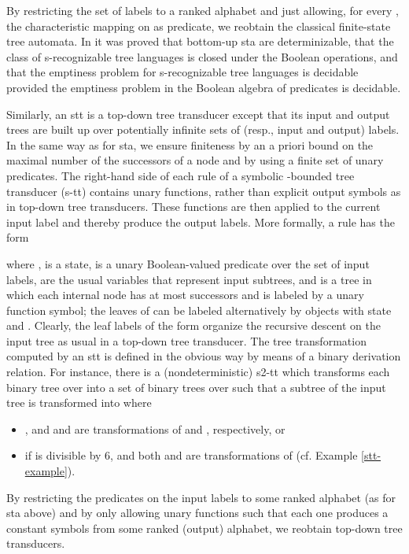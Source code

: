 \documentclass[10pt]{scrartcl}
\begin{document}
By restricting the set of labels to a ranked alphabet  and just allowing, for every , the characteristic mapping on  as predicate, we reobtain the classical finite-state tree automata. In \cite{veabjo11a} it was proved that bottom-up sta are determinizable, that the class of s-recognizable tree languages is closed under the Boolean operations, and that the emptiness problem for s-recognizable tree languages is decidable provided the emptiness problem in the Boolean algebra of predicates is decidable.

Similarly, an stt is a top-down tree transducer \cite{tha70,rou70,eng75} except that its input and output trees  are built up over potentially infinite sets of (resp., input and output) labels. 
In the same way as for  sta, we ensure finiteness by an a priori bound  on the maximal number of the successors of a node and by using a finite set of unary predicates. The right-hand side of each rule of a symbolic -bounded tree transducer (s-tt) 
contains unary functions, rather than explicit output symbols as in top-down tree transducers. These functions are then applied to the current input label and thereby produce the output labels. More formally, a rule has the form

where ,  is a state,  is a unary Boolean-valued predicate over the set of input labels,  are the usual variables that represent input subtrees, and  is a tree in which each internal node has at most  successors and is labeled by a unary function symbol; the leaves of  can be labeled alternatively by objects  with state  and . Clearly, the leaf labels of the form  organize the recursive descent on the input tree as usual in a top-down tree transducer. The tree transformation  computed by an stt is defined in the obvious way by means of a binary derivation relation. 
For instance, there is a (nondeterministic) s2-tt which transforms each binary tree over  into a set of binary trees over  such that a subtree  of the input tree is transformed into  where
\begin{itemize}
\item , and  and  are transformations of  and , respectively, or
\item  if  is divisible by 6, and both  and  are transformations of 
(cf. Example \ref{stt-example}). 
\end{itemize} 

 By restricting the predicates on the input labels to some ranked alphabet (as for sta above) and by only allowing unary functions such that each one produces a constant symbols from some ranked (output) alphabet, we reobtain top-down tree transducers.  
\end{document}
